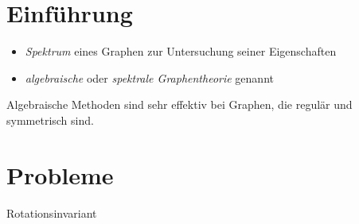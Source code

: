 \section{Einführung}

\begin{itemize}
  \item \emph{Spektrum} eines Graphen zur Untersuchung seiner Eigenschaften
  \item \emph{algebraische} oder \emph{spektrale Graphentheorie} genannt
\end{itemize}

Algebraische Methoden sind sehr effektiv bei Graphen, die regulär und symmetrisch sind.

\section{Probleme}

Rotationsinvariant
